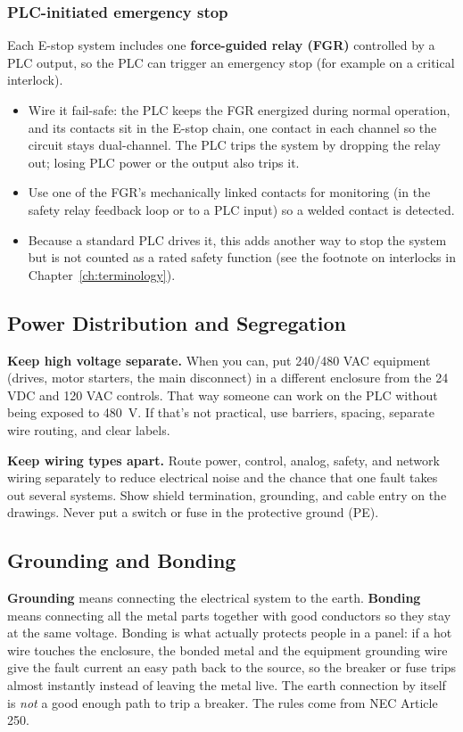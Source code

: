 \subsubsection*{PLC-initiated emergency stop}
Each E-stop system includes one \textbf{force-guided relay (FGR)} controlled by a PLC output, so the PLC can trigger an emergency stop (for example on a critical interlock).
\begin{itemize}[itemsep=2pt]
  \item Wire it fail-safe: the PLC keeps the FGR energized during normal operation, and its contacts sit in the E-stop chain, one contact in each channel so the circuit stays dual-channel. The PLC trips the system by dropping the relay out; losing PLC power or the output also trips it.
  \item Use one of the FGR's mechanically linked contacts for monitoring (in the safety relay feedback loop or to a PLC input) so a welded contact is detected.
  \item Because a standard PLC drives it, this adds another way to stop the system but is not counted as a rated safety function (see the footnote on interlocks in Chapter~\ref{ch:terminology}).
\end{itemize}

\subsection{Power Distribution and Segregation}
\textbf{Keep high voltage separate.} When you can, put 240/480 VAC equipment (drives, motor starters, the main disconnect) in a different enclosure from the 24 VDC and 120 VAC controls. That way someone can work on the PLC without being exposed to 480~V. If that's not practical, use barriers, spacing, separate wire routing, and clear labels.

\textbf{Keep wiring types apart.} Route power, control, analog, safety, and network wiring separately to reduce electrical noise and the chance that one fault takes out several systems. Show shield termination, grounding, and cable entry on the drawings. Never put a switch or fuse in the protective ground (PE).

\subsection{Grounding and Bonding}\label{sec:bonding}
\textbf{Grounding} means connecting the electrical system to the earth. \textbf{Bonding} means connecting all the metal parts together with good conductors so they stay at the same voltage. Bonding is what actually protects people in a panel: if a hot wire touches the enclosure, the bonded metal and the equipment grounding wire give the fault current an easy path back to the source, so the breaker or fuse trips almost instantly instead of leaving the metal live. The earth connection by itself is \emph{not} a good enough path to trip a breaker. The rules come from NEC Article 250.

